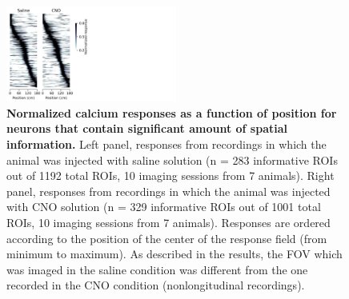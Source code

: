 \begin{figure}
    \centering
    \includegraphics[trim={0 0 500 0},clip,width=0.5\textwidth]{Figures/Chapter4/snake_plots_2p.pdf}
    \caption[Normalized calcium responses as a function of position for neurons that contain significant amount of spatial information]{\textbf{Normalized calcium responses as a function of position for neurons that contain significant amount of spatial information.} 
    Left panel, responses from recordings in which the animal was injected with saline solution (n = 283 informative ROIs out of 1192 total ROIs, 10 imaging sessions from 7 animals). 
    Right panel, responses from recordings in which the animal was injected with CNO solution (n = 329 informative ROIs out of 1001 total ROIs, 10 imaging sessions from 7 animals). 
    Responses are ordered according to the position of the center of the response field (from minimum to maximum). 
    As described in the results, the FOV which was imaged in the saline condition was different from the one recorded in the CNO condition (nonlongitudinal recordings).}
    \label{fig:chap4:snake_plot_2p}
\end{figure}


